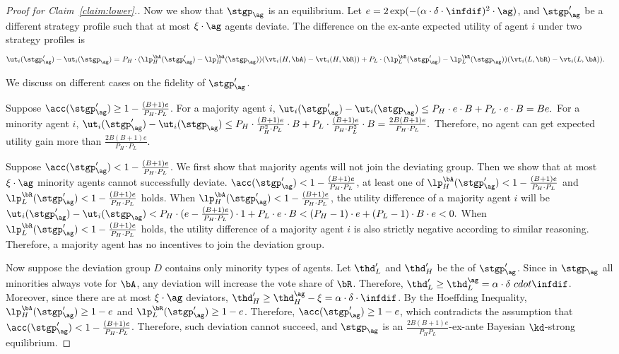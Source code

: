 \begin{proof}[Proof for Claim~\ref{claim:lower}.]
    Now we show that $\stgp_\ag$ is an equilibrium. Let $e = 2\exp(-(\alpha \cdot \delta \cdot \infdif)^2 \cdot \ag)$, and $\stgp'_\ag$  be a different strategy profile such that at most $\xi\cdot \ag$ agents deviate. The difference on the ex-ante expected utility of agent $i$ under two strategy profiles is 
    \begin{align*}
        \ut_{i}(\stgp'_\ag) - \ut_{i}(\stgp_\ag) = &\ P_H\cdot (\lp_{H}^{\bA}(\stgp'_\ag) - \lp_{H}^{\bA}(\stgp_\ag))(\vt_{i}(H, \bA) - \vt_{i}(H,\bR))+ P_L\cdot (\lp_{L}^{\bR}(\stgp'_\ag) - \lp_{L}^{\bR}(\stgp_\ag))(\vt_{i}(L, \bR) - \vt_{i}(L,\bA)).
    \end{align*}
    
    We discuss on different cases on the fidelity of $\stgp'_\ag$. 

    Suppose $\acc(\stgp'_\ag) \ge 1 -  \frac{(B+1)e}{P_H\cdot P_L}$. For a majority agent $i$, $\ut_{i}(\stgp'_\ag) - \ut_{i}(\stgp_\ag) \le P_H\cdot e\cdot B + P_L\cdot e\cdot B = Be.$ For a minority agent $i$, $\ut_{i}(\stgp'_\ag) - \ut_{i}(\stgp_\ag) \le P_H\cdot \frac{(B+1)e}{P_H^2\cdot P_L}\cdot B + P_L\cdot \frac{(B+1)e}{P_H\cdot P_L^2}\cdot B = \frac{2B(B+1)e}{P_H\cdot P_L}.$
    Therefore, no agent can get expected utility gain more than $\frac{2B(B+1)e}{P_H\cdot P_L}$. 

    Suppose $\acc(\stgp'_\ag) < 1 - \frac{(B+1)e}{P_H\cdot P_L}$. We first show that majority agents will not join the deviating group. Then we show that at most $\xi\cdot \ag$ minority agents cannot successfully deviate. $\acc(\stgp'_\ag) < 1 - \frac{(B+1)e}{P_H\cdot P_L}$, at least one of $\lp_H^{\bA}(\stgp'_\ag) < 1 - \frac{(B+1)e}{P_H\cdot P_L}$ and $\lp_L^{\bR}(\stgp'_\ag) < 1 - \frac{(B+1)e}{P_H\cdot P_L}$ holds. When $\lp_H^{\bA}(\stgp'_\ag) < 1 - \frac{(B+1)e}{P_H\cdot P_L}$, the utility difference of a majority agent $i$ will be $\ut_{i}(\stgp'_\ag) - \ut_{i}(\stgp_\ag) < P_H\cdot (e - \frac{(B+1)e}{P_H\cdot P_L} )\cdot 1 + P_L\cdot e\cdot B < (P_H - 1)\cdot e + (P_L -1)\cdot B \cdot e < 0.$ When $\lp_L^{\bR}(\stgp'_\ag) < 1 - \frac{(B+1)e}{P_H\cdot P_L}$ holds, the utility difference of a majority agent $i$ is also strictly negative according to similar reasoning. Therefore, a majority agent has no incentives to join the deviation group. 

    Now suppose the deviation group $D$ contains only minority types of agents. Let $\thd_L'$ and $\thd_H'$ be the \exshare{} of $\stgp'_\ag$. Since in $\stgp_\ag$ all minorities always vote for $\bA$, any deviation will increase the vote share of $\bR$. Therefore, $\thd_L' \ge \thd_L^\ag = \alpha \cdot \delta\ cdot \infdif$. Moreover, since there are at most $\xi\cdot \ag$ deviators, $\thd_H' \ge \thd_H^\ag - \xi = \alpha \cdot \delta \cdot \infdif$. By the Hoeffding Inequality, $\lp_H^{\bA}(\stgp'_\ag) \ge 1 - e$ and $\lp_L^{\bR}(\stgp'_\ag) \ge 1 - e$. Therefore, $\acc(\stgp'_\ag) \ge 1 - e$, which contradicts the assumption that $\acc(\stgp'_\ag) < 1 - \frac{(B+1)e}{P_H\cdot P_L}$. Therefore, such deviation cannot succeed, and $\stgp_\ag$ is an $\frac{2B(B+1)e}{P_HP_L}$-ex-ante Bayesian $\kd$-strong equilibrium. 
\end{proof}

